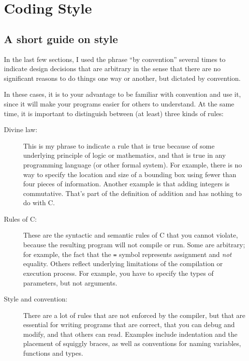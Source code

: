 

\chapter{Coding Style}
\section{A short guide on style}


In the last few sections, I used the phrase ``by convention''
several times to indicate design decisions that are arbitrary
in the sense that there are no significant reasons to do things
one way or another, but dictated by convention.

In these cases, it is to your advantage to be familiar with
convention and use it, since it will make your programs easier
for others to understand.  At the same time, it is important to
distinguish between (at least) three kinds of rules:

\begin{description}

\item[Divine law:]  This is my phrase to indicate a rule that
is true because of some underlying principle of logic or
mathematics, and that is true in any programming language
(or other formal system).  For example, there is no way to
specify the location and size of a bounding box using fewer
than four pieces of information.  Another example is that adding
integers is commutative.  That's part of the definition of
addition and has nothing to do with C.

\item[Rules of C:]  These are the syntactic and semantic
rules of C that you cannot violate, because the
resulting program will not compile or run.  Some are arbitrary;
for example, the fact that the {\tt =} symbol represents
assignment and {\em not} equality.  Others reflect
underlying limitations of the compilation or execution process.
For example, you have to specify the types of parameters, but
not arguments.

\item[Style and convention:]  There are a lot of rules that
are not enforced by the compiler, but that are essential for
writing programs that are correct, that you can debug and
modify, and that others can read.  Examples include indentation
and the placement of squiggly braces, as well as conventions
for naming variables, functions and types.

\end{description}

